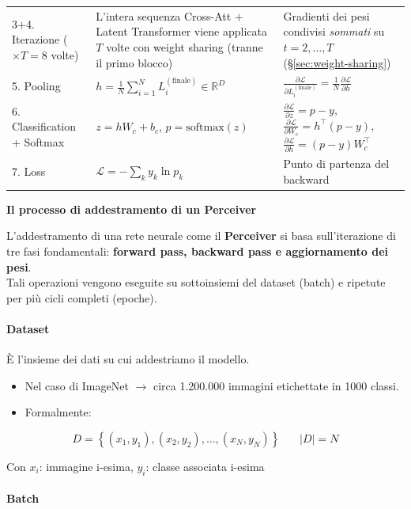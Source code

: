 \documentclass[
  11pt,
]{article}
\begin{document}
{\begin{longtable}{@{}p{2.8cm} p{5.5cm} p{5.5cm}@{}}
3$+$4. Iterazione \newline ($\times T = 8$ volte) & L'intera sequenza Cross-Att $+$ Latent Transformer viene applicata $T$ volte con weight sharing (tranne il primo blocco) & Gradienti dei pesi condivisi \emph{sommati} su $t = 2, \ldots, T$ (\S\ref{sec:weight-sharing}) \\[4pt]
5. Pooling & $h = \frac{1}{N}\sum_{i=1}^{N} L_i^{(\text{finale})} \in \mathbb{R}^D$ & $\frac{\partial \mathcal{L}}{\partial L_i^{(\text{finale})}} = \frac{1}{N} \frac{\partial \mathcal{L}}{\partial h}$ \\[4pt]
6. Classification + Softmax & $z = h W_c + b_c$, $p = \text{softmax}(z)$ & $\frac{\partial \mathcal{L}}{\partial z} = p - y$, $\frac{\partial \mathcal{L}}{\partial W_c} = h^\top (p-y)$, $\frac{\partial \mathcal{L}}{\partial h} = (p-y) W_c^\top$ \\[4pt]
7. Loss & $\mathcal{L} = -\sum_k y_k \ln p_k$ & Punto di partenza del backward \\
\bottomrule
\end{longtable}
}

\textbf{Il processo di addestramento di un Perceiver}

L'addestramento di una rete neurale come il \textbf{Perceiver} si basa
sull'iterazione di tre fasi fondamentali: \textbf{forward pass, backward
pass e aggiornamento dei pesi}.\\
Tali operazioni vengono eseguite su sottoinsiemi del dataset (batch) e
ripetute per più cicli completi (epoche).

\paragraph{Dataset}


È l'insieme dei dati su cui addestriamo il modello.


\begin{itemize}
\item
  Nel caso di ImageNet \(\rightarrow\) circa 1.200.000 immagini
  etichettate in 1000 classi.
\item
  Formalmente:
\end{itemize}


\[D = \left\{ \left( x_{1},y_{1} \right),\left( x_{2},y_{2} \right),\ldots,\left( x_{N},y_{N} \right) \right\}\ \ \ \ \ \ \ \ |D| = N\]

Con \(x_{i}\): immagine i-esima, \(y_{i}\): classe associata i-esima


\paragraph{Batch}
\end{document}
